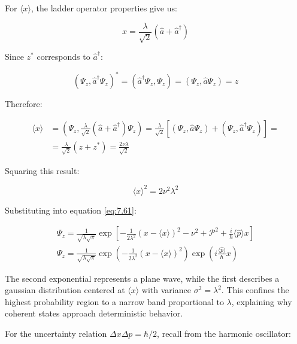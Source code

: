 \documentclass[italian]{HKNdocument}
\begin{document}
For $\langle x\rangle$, the ladder operator properties give us:

\begin{equation}
x=\frac{\lambda}{\sqrt{2}}\left(\hat{a}+\hat{a}^{\dagger}\right)
\end{equation}

Since $z^{*}$ corresponds to $\hat{a}^{\dagger}$:

\begin{equation}
\left(\Psi_{z}, \hat{a}^{\dagger} \Psi_{z}\right)^{*}=\left(\hat{a}^{\dagger} \Psi_{z}, \Psi_{z}\right)=\left(\Psi_{z}, \hat{a} \Psi_{z}\right)=z
\end{equation}

Therefore:

\begin{align}
\langle x\rangle & =\left(\Psi_{z}, \frac{\lambda}{\sqrt{2}}\left(\hat{a}+\hat{a}^{\dagger}\right) \Psi_{z}\right)=\frac{\lambda}{\sqrt{2}}\left[\left(\Psi_{z}, \hat{a} \Psi_{z}\right)+\left(\Psi_{z}, \hat{a}^{\dagger} \Psi_{z}\right)\right]=  \\
& =\frac{\lambda}{\sqrt{2}}\left(z+z^{*}\right)=\frac{2 \nu \lambda}{\sqrt{2}}
\end{align}

Squaring this result:

\begin{equation}
\langle x\rangle^{2}=2 \nu^{2} \lambda^{2}
\end{equation}

Substituting into equation \eqref{eq:7.61}:

\begin{gather}
\Psi_{z}=\frac{1}{\sqrt{\lambda \sqrt{\pi}}} \exp \left[-\frac{1}{2 \lambda^{2}}(x-\langle x\rangle)^{2}-\mathcal{\nu}^{2}+\mathcal{P}^{2}+\frac{i}{\hbar}\langle\hat{p}\rangle x\right]  \\
\Psi_{z}=\frac{1}{\sqrt{\lambda \sqrt{\pi}}} \exp \left(-\frac{1}{2 \lambda^{2}}(x-\langle x\rangle)^{2}\right) \exp \left(i \frac{\langle\hat{p}\rangle}{\hbar} x\right)
\end{gather}

The second exponential represents a plane wave, while the first describes a gaussian distribution centered at $\langle x\rangle$ with variance $\sigma^{2}=\lambda^{2}$. This confines the highest probability region to a narrow band proportional to $\lambda$, explaining why coherent states approach deterministic behavior.

For the uncertainty relation $\Delta x \Delta p=\hbar / 2$, recall from the harmonic oscillator:
\end{document}
